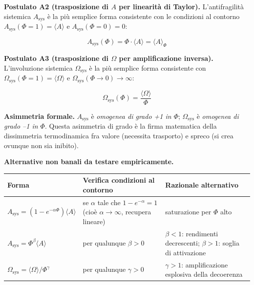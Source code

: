 \Hypoth{} \textbf{Postulato A2 (trasposizione di \(A\) per linearità di
Taylor).} L'antifragilità sistemica \(A_{\text{sys}}\) è la più semplice
forma consistente con le condizioni al contorno
\(A_{\text{sys}}(\Phi=1) = \langle A\rangle\) e
\(A_{\text{sys}}(\Phi=0) = 0\):

\[
A_{\text{sys}}(\Phi) = \Phi \cdot \langle A \rangle = \langle A \rangle_\Phi
\]

\Hypoth{} \textbf{Postulato A3 (trasposizione di \(\Omega\) per
amplificazione inversa).} L'involuzione sistemica
\(\Omega_{\text{sys}}\) è la più semplice forma consistente con
\(\Omega_{\text{sys}}(\Phi=1) = \langle\Omega\rangle\) e
\(\Omega_{\text{sys}}(\Phi \to 0) \to \infty\):

\[
\Omega_{\text{sys}}(\Phi) = \frac{\langle \Omega \rangle}{\Phi}
\]

\Proved{} \textbf{Asimmetria formale.} \(A_{\text{sys}}\) è
\emph{omogenea di grado +1 in \(\Phi\)}; \(\Omega_{\text{sys}}\) è
\emph{omogenea di grado --1 in \(\Phi\)}. Questa asimmetria di grado è la
firma matematica della dissimmetria termodinamica fra valore (necessita
trasporto) e spreco (si crea ovunque non sia inibito).

\Conj{} \textbf{Alternative non banali da testare empiricamente.}

{\def\LTcaptype{none} %
{\small\begin{longtable}[]{@{}
  >{\raggedright\arraybackslash}p{}
  >{\raggedright\arraybackslash}p{}
  >{\raggedright\arraybackslash}p{}@{}}
\toprule\noalign{}
\begin{minipage}[b]{\linewidth}\raggedright
Forma
\end{minipage} & \begin{minipage}[b]{\linewidth}\raggedright
Verifica condizioni al contorno
\end{minipage} & \begin{minipage}[b]{\linewidth}\raggedright
Razionale alternativo
\end{minipage} \\
\midrule\noalign{}
\endhead
\bottomrule\noalign{}
\endlastfoot
\(A_{\text{sys}} = (1 - e^{-\alpha\Phi})\langle A\rangle\) & \Proved{}
se \(\alpha\) tale che \(1-e^{-\alpha} = 1\) (cioè
\(\alpha \to \infty\), recupera lineare) & saturazione per \(\Phi\)
alto \\
\(A_{\text{sys}} = \Phi^\beta \langle A\rangle\) & \Proved{} per
qualunque \(\beta > 0\) & \(\beta < 1\): rendimenti decrescenti;
\(\beta > 1\): soglia di attivazione \\
\(\Omega_{\text{sys}} = \langle\Omega\rangle / \Phi^\gamma\) & \Proved{}
per qualunque \(\gamma > 0\) & \(\gamma > 1\): amplificazione esplosiva
della decoerenza \\
\end{longtable}}
}

